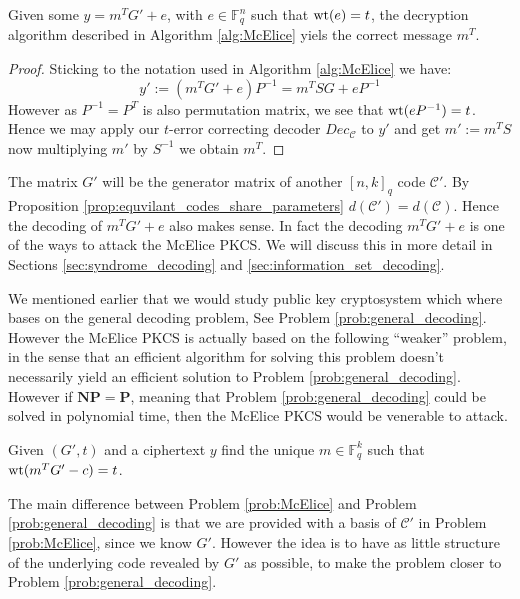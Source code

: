 \begin{proposition}\label{prop:decryption_algorithm_produces_correct_message}
  Given some $y = m^{T}G' + e$, with $e \in \mathbb{F}_q^{n}$ such that $\mathrm{wt}(e) = t$, the decryption algorithm described in Algorithm \ref{alg:McElice} yiels the correct message $m^{T}$.
\end{proposition}
\begin{proof}
  Sticking to the notation used in Algorithm \ref{alg:McElice} we have:
  \begin{equation*}
    y' := (m^{T} G' + e) P^{-1} = m^{T}SG + e P^{-1}
  \end{equation*}
  However as $P^{-1} = P^{T}$ is also permutation matrix, we see that $\mathrm{wt}(eP^{-1}) = t$. Hence we may apply our $t$-error correcting decoder $Dec_{\mathcal{C}}$ to $y'$ and get $m' := m^{T}S$ now multiplying $m'$ by $S^{-1}$ we obtain $m^{T}$.
\end{proof}

\begin{remark}
  The matrix $G'$ will be the generator matrix of another $[n, k]_{q}$ code $\mathcal{C}'$. By Proposition \ref{prop:equvilant_codes_share_parameters} $d(\mathcal{C}') = d(\mathcal{C})$. Hence the decoding of $m^T G' + e$ also makes sense. In fact the decoding $m^T G' + e$ is one of the ways to attack the McElice PKCS. We will discuss this in more detail in Sections \ref{sec:syndrome_decoding} and \ref{sec:information_set_decoding}.
\end{remark}

We mentioned earlier that we would study public key cryptosystem which where bases on the general decoding problem, See Problem \ref{prob:general_decoding}. However the McElice PKCS is actually based on the following ``weaker'' problem, in the sense that an efficient algorithm for solving this problem doesn't necessarily yield an efficient solution to Problem \ref{prob:general_decoding}. However if $\mathbf{NP} = \mathbf{P}$, meaning that Problem \ref{prob:general_decoding} could be solved in polynomial time, then the McElice PKCS would be venerable to attack.
\begin{problem}\label{prob:McElice}
  Given $(G', t)$ and a ciphertext $y$ find the unique $m \in \mathbb{F}_q^{k}$ such that $\mathrm{wt}(m^{T}G' - c) = t$.
\end{problem}
The main difference between Problem \ref{prob:McElice} and Problem \ref{prob:general_decoding} is that we are provided with a basis of $\mathcal{C}'$ in Problem \ref{prob:McElice}, since we know $G'$. However the idea is to have as little structure of the underlying code revealed by $G'$ as possible, to make the problem closer to Problem \ref{prob:general_decoding}.


